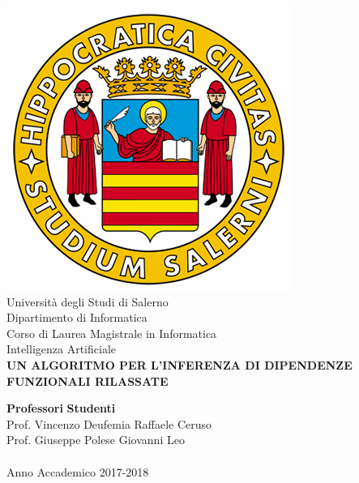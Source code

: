 \begin{center}
    \includegraphics[scale = 0.30]{Immagini/logoUnisa.png}\\
    \vspace{1cm}
    {\Large Università degli Studi di Salerno}\\[0.2truecm]
    {\large Dipartimento di Informatica}\\
    \hrulefill
    \vfill
    {\large Corso di Laurea Magistrale in Informatica  }\\[0.2truecm]
    {\Large Intelligenza Artificiale}\\
    \vfill
    {\large \bf UN ALGORITMO PER L'INFERENZA DI DIPENDENZE 
    FUNZIONALI RILASSATE}
    \vfill\vfill
    
    {\bf Professori} \hfill {\bf Studenti} \\
     Prof. Vincenzo Deufemia \hfill Raffaele Ceruso \\
 
    
    
    
    Prof. Giuseppe Polese  \hfill Giovanni Leo \\
    \vspace{1cm}
    \hrulefill \\
  	\vspace{1cm}
    Anno Accademico 2017-2018
\end{center}